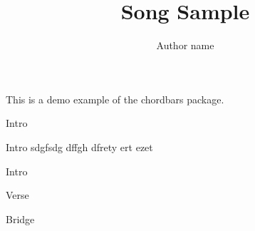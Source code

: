 \documentclass[11pt]{article}
\title{Song Sample}
\author{Author name}
\begin{document}
\maketitle

This is a demo example of the chordbars package.

\begin{chordbar}{4}{1}{Intro}
\end{chordbar}

\begin{chordbar}{4}{1}{Intro sdgfsdg dffgh dfrety ert ezet }
\end{chordbar}

\begin{chordbar}{4}{1}{Intro}
\end{chordbar}


\begin{chordbar}{8}{2}{Verse}
\end{chordbar}

\begin{chordbar}{8}{1}{Bridge}
\end{chordbar}
\end{document}
